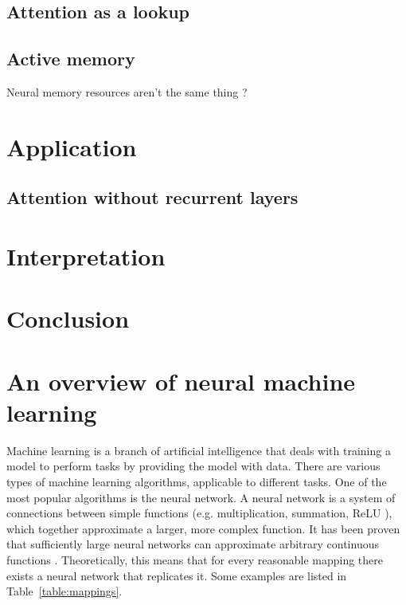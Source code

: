 \documentclass{article}
\begin{document}
\cite{graphs}

\subsection{Attention as a lookup}

\subsection{Active memory}

\cite{active_memory}

Neural memory resources aren't the same thing \cite{neural_turing}?

\section{Application}

\subsection{Attention without recurrent layers}

\cite{attn_all_you_need}

\section{Interpretation}

\section{Conclusion}

\appendix
\section{An overview of neural machine learning}

Machine learning is a branch of artificial intelligence that deals with training a model to perform tasks by providing the model with data. There are various types of machine learning algorithms, applicable to different tasks. One of the most popular algorithms is the neural network. A neural network is a system of connections between simple functions (e.g. multiplication, summation, ReLU \cite{relu}), which together approximate a larger, more complex function. It has been proven that sufficiently large neural networks can approximate arbitrary continuous functions \cite{universal_approximators}. Theoretically, this means that for every reasonable mapping there exists a neural network that replicates it. Some examples are listed in Table~\ref{table:mappings}.
\end{document}
